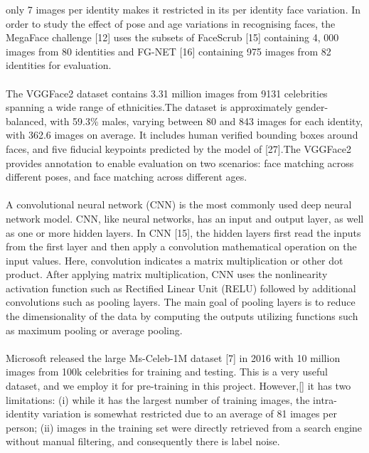only 7 images per identity makes it restricted in its per identity face variation. In order to study the effect of pose and age
variations in recognising faces, the MegaFace challenge [12]
uses the subsets of FaceScrub [15] containing 4, 000 images
from 80 identities and FG-NET [16] containing 975 images
from 82 identities for evaluation.
\\\\
The VGGFace2 dataset contains 3.31 million images from
9131 celebrities spanning a wide range of ethnicities.The dataset is approximately
gender-balanced, with 59.3\% males, varying between 80
and 843 images for each identity, with 362.6 images on
average. It includes human verified bounding boxes around
faces, and five fiducial keypoints predicted by the model
of [27].The VGGFace2 provides annotation to enable evaluation
on two scenarios: face matching across different poses, and
face matching across different ages.
\\\\
A convolutional neural network (CNN) is the most commonly used deep neural network model. CNN, like neural networks, has an input and output layer, as well as one or more hidden layers. In CNN [15], the hidden layers first read the inputs from the first layer and then apply a convolution mathematical operation on the input values. Here, convolution indicates a matrix multiplication or other dot product. After applying matrix multiplication, CNN uses the nonlinearity activation function such as Rectified Linear Unit (RELU) followed by additional convolutions such as pooling layers. The main goal of pooling layers is to reduce the dimensionality of the data by computing the outputs utilizing functions such as maximum pooling or average pooling.
\\\\
Microsoft released the large Ms-Celeb-1M dataset [7]
in 2016 with 10 million images from 100k celebrities for training and testing. This is a very useful dataset, and we
employ it for pre-training in this project. However,[] it has two
limitations: (i) while it has the largest number of training
images, the intra-identity variation is somewhat restricted
due to an average of 81 images per person; (ii) images
in the training set were directly retrieved from a search
engine without manual filtering, and consequently there is
label noise.